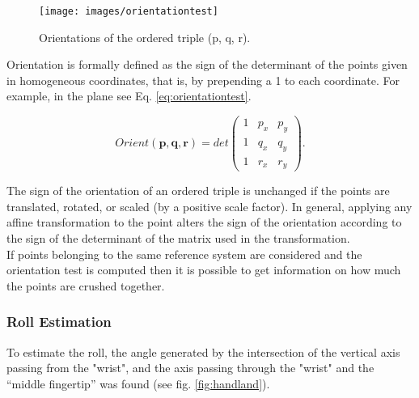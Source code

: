 \begin{figure}[H]
	\centering
	\texttt{[image: images/orientationtest]}
	\caption[Orientation test.]{Orientations of the ordered triple (p, q, r).}
	\label{fig:orientationtest}
\end{figure}

\noindent Orientation is formally defined as the sign of the determinant of the points given in homogeneous coordinates, that is, by prepending a 1 to each coordinate. For example, in the plane see Eq. \ref{eq:orientationtest}.

\begin{Equation}[!htb]
	\centering
	\begin{equation} \label{eq:orientationtest}
		Orient(\bm{p},\bm{q},\bm{r}) = det
		\begin{pmatrix}
			1 & p_x & p_y \\
			1 & q_x & q_y \\
			1 & r_x & r_y 
		\end{pmatrix} .
		\end{equation}
	\caption[Orientation test.]{Thus orientation generalizes the familiar \gls{1d} binary relations $<, =, >$.}
\end{Equation}

\noindent The sign of the orientation of an ordered triple is unchanged if the points are translated, rotated, or scaled (by a positive scale factor). In general, applying any affine transformation to the point alters the sign of the orientation according to the sign of the determinant of the matrix used in the transformation. \\

\noindent If points belonging to the same reference system are considered and the orientation test is computed then it is possible to get information on how much the points are crushed together. 

\subsubsection{Roll Estimation}
\label{subsec:roll}
To estimate the roll, the angle generated by the intersection of the vertical axis passing from the "wrist", and the axis passing through the "wrist" and the “middle fingertip” was found (see fig. \ref{fig:handland}).

